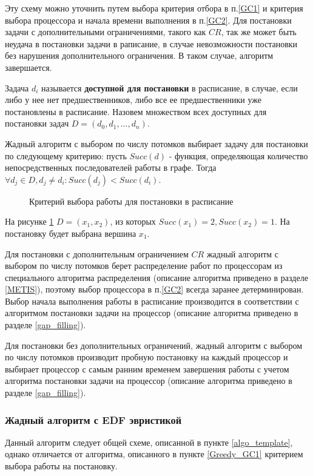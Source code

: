Эту схему можно уточнить путем выбора критерия отбора в п.\ref{GC1} и критерия выбора процессора и начала времени выполнения в п.\ref{GC2}. Для постановки задачи с дополнительными ограничениями, такого как $CR$, так же может быть неудача в постановки задачи в раписание, в случае невозможности постановки без нарушения дополнительного ограничения. В таком случае, алгоритм завершается.

Задача $d_i$ называется \textbf{доступной для постановки} в расписание, в случае, если либо у нее нет предшественников, либо все ее предшественники уже постановлены в расписание. Назовем множеством всех доступных для постановки задач $D = \left( d_0, d_1, \ldots, d_n \right)$.

Жадный алгоритм с выбором по числу потомков выбирает задачу для постановки по следующему критерию: пусть $Succ(d)$ - функция, определяющая количество непосредственных последователей работы в графе. Тогда $\forall d_j \in D, d_j \neq d_i: Succ(d_j) < Succ(d_i)$.

\begin{figure}[!htbp]
    \caption{Критерий выбора работы для постановки в расписание}
    \label{fig:max-children}
\end{figure}
На рисунке \ref{fig:max-children} $D = \left( x_1, x_2 \right)$, из которых $Succ(x_1) = 2, Succ(x_2) = 1$. На постановку будет выбрана вершина $x_1$.

Для постановки с дополнительным ограничением $CR$ жадный алгоритм с выбором по числу потомков берет распределение работ по процессорам из специального алгоритма распределения (описание алгоритма приведено в разделе \ref{METIS}), поэтому выбор процессора в п.\ref{GC2} всегда заранее детерминирован. Выбор начала выполнения работы в расписание производится в соответствии с алгоритмом постановки задачи на процессор (описание алгоритма приведено в разделе \ref{gap_filling}).

Для постановки без дополнительных ограничений, жадный алгоритм с выбором по числу потомков производит пробную постановку на каждый процессор и выбирает процессор с самым ранним временем завершения работы с учетом алгоритма постановки задачи на процессор (описание алгоритма приведено в разделе \ref{gap_filling}).

\subsubsection{Жадный алгоритм с EDF эвристикой} \label{Greedy_EDF}
Данный алгоритм следует общей схеме, описанной в пункте \ref{algo_template}, однако отличается от алгоритма, описанного в пункте \ref{Greedy_GC1} критерием выбора работы на постановку.

